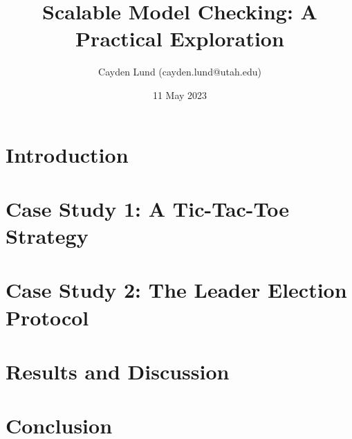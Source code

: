 \documentclass[12pt]{article}
\author{Cayden Lund (cayden.lund@utah.edu)}
\date{11 May 2023}
\title{Scalable Model Checking: A Practical Exploration}
\begin{document}
    \maketitle


    \section{Introduction}\label{sec:introduction}

    


    \section{Case Study 1: A Tic-Tac-Toe Strategy}\label{sec:tic-tac-toe}

    


    \section{Case Study 2: The Leader Election Protocol}\label{sec:leader-election}

    


    \section{Results and Discussion}\label{sec:results-and-discussion}

    


    \section{Conclusion}\label{sec:conclusion}

    
\end{document}
